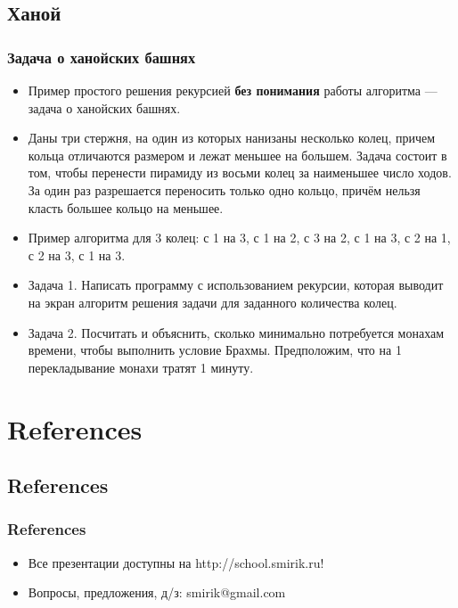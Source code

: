 \documentclass[compress,red]{beamer}
\begin{document}
\subsection{Ханой}
\begin{frame}[fragile]
\frametitle{Задача о ханойских башнях}
		\begin{itemize}
		\item Пример простого решения рекурсией \textbf{без понимания} работы алгоритма --- задача о ханойских башнях.
		\item Даны три стержня, на один из которых нанизаны несколько колец, причем кольца отличаются размером и лежат меньшее на большем. Задача состоит в том, чтобы перенести пирамиду из восьми колец за наименьшее число ходов. За один раз разрешается переносить только одно кольцо, причём нельзя класть большее кольцо на меньшее.
		\item Пример алгоритма для 3 колец: с 1 на 3, с 1 на 2, с 3 на 2, с 1 на 3, с 2 на 1, с 2 на 3, с 1 на 3.
		\item \scriptsize{Задача 1. Написать программу с использованием рекурсии, которая выводит на экран алгоритм решения задачи для заданного количества колец.}
		\item \scriptsize{Задача 2. Посчитать и объяснить, сколько минимально потребуется монахам времени, чтобы выполнить условие Брахмы. Предположим, что на 1 перекладывание монахи тратят 1 минуту.}
		\end{itemize}
\end{frame}

\section{References}
\subsection{References}
\begin{frame}[fragile]
  \frametitle{References}
  \begin{itemize}
    \item Все презентации доступны на http://school.smirik.ru!
    \item Вопросы, предложения, д/з: smirik@gmail.com
  \end{itemize}
\end{frame}
\end{document}
